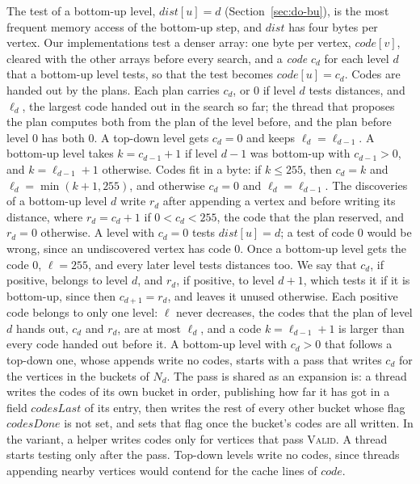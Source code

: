 The test of a bottom-up level, $\mathit{dist}[u] = d$ (Section~\ref{sec:do-bu}), is the most frequent memory access of the bottom-up step, and $\mathit{dist}$ has four bytes per vertex. Our implementations test a denser array: one byte per vertex, $\mathit{code}[v]$, cleared with the other arrays before every search, and a \emph{code} $c_d$ for each level $d$ that a bottom-up level tests, so that the test becomes $\mathit{code}[u] = c_d$. Codes are handed out by the plans. Each plan carries $c_d$, or 0 if level $d$ tests distances, and $\ell_d$, the largest code handed out in the search so far; the thread that proposes the plan computes both from the plan of the level before, and the plan before level 0 has both 0. A top-down level gets $c_d = 0$ and keeps $\ell_d = \ell_{d-1}$. A bottom-up level takes $k = c_{d-1} + 1$ if level $d-1$ was bottom-up with $c_{d-1} > 0$, and $k = \ell_{d-1} + 1$ otherwise. Codes fit in a byte: if $k \leq 255$, then $c_d = k$ and $\ell_d = \min(k + 1, 255)$, and otherwise $c_d = 0$ and $\ell_d = \ell_{d-1}$. The discoveries of a bottom-up level $d$ write $r_d$ after appending a vertex and before writing its distance, where $r_d = c_d + 1$ if $0 < c_d < 255$, the code that the plan reserved, and $r_d = 0$ otherwise. A level with $c_d = 0$ tests $\mathit{dist}[u] = d$; a test of code 0 would be wrong, since an undiscovered vertex has code 0. Once a bottom-up level gets the code 0, $\ell = 255$, and every later level tests distances too. We say that $c_d$, if positive, belongs to level $d$, and $r_d$, if positive, to level $d+1$, which tests it if it is bottom-up, since then $c_{d+1} = r_d$, and leaves it unused otherwise. Each positive code belongs to only one level: $\ell$ never decreases, the codes that the plan of level $d$ hands out, $c_d$ and $r_d$, are at most $\ell_d$, and a code $k = \ell_{d-1} + 1$ is larger than every code handed out before it. A bottom-up level with $c_d > 0$ that follows a top-down one, whose appends write no codes, starts with a pass that writes $c_d$ for the vertices in the buckets of $N_d$. The pass is shared as an expansion is: a thread writes the codes of its own bucket in order, publishing how far it has got in a field $\mathit{codesLast}$ of its entry, then writes the rest of every other bucket whose flag $\mathit{codesDone}$ is not set, and sets that flag once the bucket's codes are all written. In the variant, a helper writes codes only for vertices that pass \textsc{Valid}. A thread starts testing only after the pass. Top-down levels write no codes, since threads appending nearby vertices would contend for the cache lines of $\mathit{code}$.

